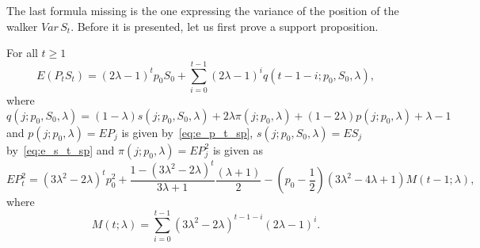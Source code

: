 \documentclass[runningheads]{CMSIM}
\begin{document}
    The last formula missing is the one expressing the variance of the
    position of the walker $Var\,S_{t}$.
    Before it is presented, let
    us first prove a support proposition.
    \begin{proposition}
        \label{prop:e_p_s_t_sp}
        For all $t\ge1$
        \begin{equation}
            E(P_{t}S_{t})=(2\lambda-1)^{t}p_{0}S_{0}+\sum_{i=0}^{t-1}(2\lambda-1)^{i}q(t-1-i;p_{0},S_{0},\lambda),\label{eq:e_p_s_t_sp}
        \end{equation}
        where
        \[
            q(j;p_{0},S_{0},\lambda)=(1-\lambda)s(j;p_{0},S_{0},\lambda)+2\lambda\pi(j;p_{0},\lambda)+(1-2\lambda)p(j;p_{0},\lambda)+\lambda-1
        \]
        and $p(j;p_{0},\lambda)=EP_{j}$ is given by~\eqref{eq:e_p_t_sp}, $s(j;p_{0},S_{0},\lambda)=ES_{j}$
        by~\eqref{eq:e_s_t_sp} and $\pi(j;p_{0},\lambda)=EP_{j}^{2}$
        is given as
        \begin{equation}
            EP_{t}^{2}=(3\lambda^{2}-2\lambda)^{t}p_{0}^{2}+\frac{1-(3\lambda^{2}-2\lambda)^{t}}{3\lambda+1}\frac{(\lambda+1)}{2}-(p_{0}-\frac{1}{2})(3\lambda^2 - 4\lambda +1)M(t-1;\lambda),\label{eq:e_p2_t_sp}
        \end{equation}
        where
        \[
            M(t;\lambda)=\sum_{i=0}^{t-1}(3\lambda^{2}-2\lambda)^{t-1-i}(2\lambda-1)^{i}.
        \]
    \end{proposition}
\end{document}
